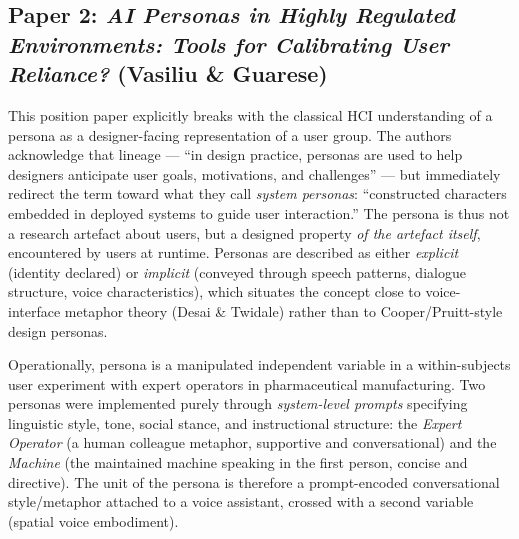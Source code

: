 
\subsection*{Paper 2: \textit{AI Personas in Highly Regulated Environments: Tools for Calibrating User Reliance?} (Vasiliu \& Guarese)}

This position paper explicitly breaks with the classical HCI understanding of a persona as a designer-facing representation of a user group. The authors acknowledge that lineage --- ``in design practice, personas are used to help designers anticipate user goals, motivations, and challenges'' --- but immediately redirect the term toward what they call \emph{system personas}: ``constructed characters embedded in deployed systems to guide user interaction.'' The persona is thus not a research artefact about users, but a designed property \emph{of the artefact itself}, encountered by users at runtime. Personas are described as either \emph{explicit} (identity declared) or \emph{implicit} (conveyed through speech patterns, dialogue structure, voice characteristics), which situates the concept close to voice-interface metaphor theory (Desai \& Twidale) rather than to Cooper/Pruitt-style design personas.

Operationally, persona is a manipulated independent variable in a within-subjects user experiment with expert operators in pharmaceutical manufacturing. Two personas were implemented purely through \emph{system-level prompts} specifying linguistic style, tone, social stance, and instructional structure: the \textit{Expert Operator} (a human colleague metaphor, supportive and conversational) and the \textit{Machine} (the maintained machine speaking in the first person, concise and directive). The unit of the persona is therefore a prompt-encoded conversational style/metaphor attached to a voice assistant, crossed with a second variable (spatial voice embodiment).

